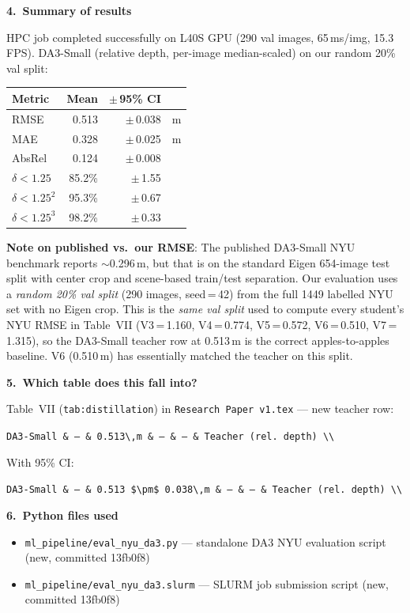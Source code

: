 \documentclass[11pt,a4paper]{article}
\begin{document}
\textbf{4.\ Summary of results}

HPC job completed successfully on L40S GPU (290 val images,
65\,ms/img, 15.3\,FPS).  DA3-Small (relative depth, per-image
median-scaled) on our random 20\% val split:

\begin{center}
\begin{tabular}{lrrl}
\toprule
\textbf{Metric} & \textbf{Mean} & \textbf{$\pm$\,95\% CI} & \\
\midrule
RMSE     & 0.513 & $\pm$\,0.038 & m \\
MAE      & 0.328 & $\pm$\,0.025 & m \\
AbsRel   & 0.124 & $\pm$\,0.008 &   \\
$\delta<1.25$  & 85.2\%  & $\pm$\,1.55 & \\
$\delta<1.25^2$ & 95.3\% & $\pm$\,0.67 & \\
$\delta<1.25^3$ & 98.2\% & $\pm$\,0.33 & \\
\bottomrule
\end{tabular}
\end{center}

\textbf{Note on published vs.\ our RMSE}: The published DA3-Small NYU
benchmark reports $\sim$0.296\,m, but that is on the standard Eigen
654-image test split with center crop and scene-based train/test
separation.  Our evaluation uses a \emph{random 20\% val split}
(290 images, seed\,=\,42) from the full 1449 labelled NYU set with
no Eigen crop.  This is the \emph{same val split} used to compute
every student's NYU RMSE in Table~VII (V3\,=\,1.160, V4\,=\,0.774,
V5\,=\,0.572, V6\,=\,0.510, V7\,=\,1.315), so the DA3-Small
teacher row at 0.513\,m is the correct apples-to-apples baseline.
V6 (0.510\,m) has essentially matched the teacher on this split.

\textbf{5.\ Which table does this fall into?}

Table~VII (\texttt{tab:distillation}) in
\texttt{Research Paper v1.tex} — new teacher row:

\texttt{DA3-Small \& ---  \& 0.513\textbackslash,m \& --- \& ---
  \& Teacher (rel.\ depth) \textbackslash\textbackslash}

With 95\% CI:

\texttt{DA3-Small \& ---  \& 0.513 \$\textbackslash pm\$
  0.038\textbackslash,m \& --- \& ---
  \& Teacher (rel.\ depth) \textbackslash\textbackslash}

\textbf{6.\ Python files used}

\begin{itemize}
  \item \texttt{ml\_pipeline/eval\_nyu\_da3.py} — standalone DA3
    NYU evaluation script (new, committed 13fb0f8)
  \item \texttt{ml\_pipeline/eval\_nyu\_da3.slurm} — SLURM job
    submission script (new, committed 13fb0f8)
\end{itemize}
\end{document}
